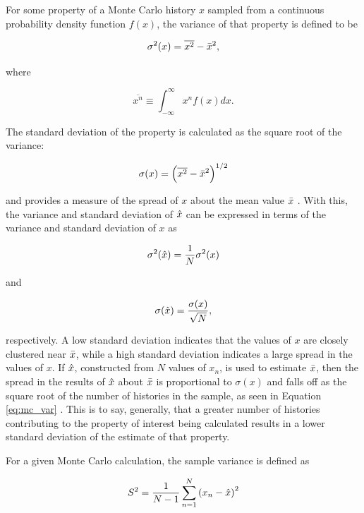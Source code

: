 For some property of a Monte Carlo history $x$ sampled from a continuous probability density 
function $f(x)$, the variance of that property is defined to be

\begin{equation}
\sigma^2(x) = \overline{x^2} - \bar{x}^2,
\end{equation}

\noindent where

\begin{equation}
\overline{x^n} \equiv\int_{-\infty}^{\infty}x^n f(x)dx.
\end{equation}

The standard deviation of the property is calculated as the square root of the
variance:

\begin{equation}
\sigma(x) = \left(\overline{x^2} - \bar{x}^2\right)^{1/2}
\end{equation}

\noindent and provides a measure of the spread of $x$ about the mean value $\bar{x}$
\cite{lm}. With this, the variance and standard deviation of $\hat{x}$ can be 
expressed in terms of the variance and standard deviation of $x$ as

\begin{equation}
\sigma^2(\hat{x}) = \frac{1}{N}\sigma^2(x)
\end{equation}

\noindent and

\begin{equation}
\label{eq:mc_var}
\sigma(\hat{x}) = \frac{\sigma(x)}{\sqrt{N}}, 
\end{equation}

\noindent respectively. A low standard deviation indicates that the values of $x$ are 
closely clustered near $\bar{x}$, while a high standard deviation indicates a large 
spread in the values of $x$. If $\hat{x}$, constructed from $N$ values of $x_n$, is
used to estimate $\bar{x}$, then the spread in the results of $\hat{x}$ about $\bar{x}$
is proportional to $\sigma(x)$ and falls off as the square root of the number of 
histories in the sample, as seen in Equation \ref{eq:mc_var} \cite{lm}. This is to 
say, generally, that a greater number of histories contributing to the property of 
interest being calculated results in a lower standard deviation of the estimate of 
that property.

For a given Monte Carlo calculation, the sample variance is defined as

\begin{equation}
S^2 = \frac{1}{N-1}\sum_{n=1}^{N}\left(x_n - \hat{x}\right)^2
\end{equation}

